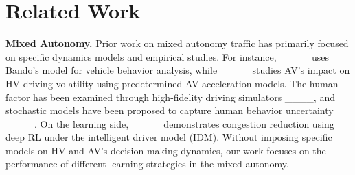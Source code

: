 \section{Related Work}

{\bf Mixed Autonomy.} Prior work on mixed autonomy traffic has primarily focused on specific dynamics models and empirical studies. For instance, ____ uses Bando's model for vehicle behavior analysis, while ____ studies AV's impact on HV driving volatility using predetermined AV acceleration models. The human factor has been examined through high-fidelity driving simulators ____, and stochastic models have been proposed to capture human behavior uncertainty ____. On the learning side, ____ demonstrates congestion reduction using deep RL under the intelligent driver model (IDM). Without imposing specific models on HV and AV's decision making dynamics, our work focuses on the performance of different learning strategies in the mixed autonomy.

